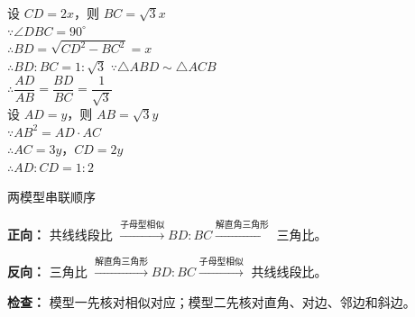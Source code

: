 \documentclass{exam-zh}
\begin{document}
\begin{eduDualExplain}
  \begin{eduExplainLeft}
  \end{eduExplainLeft}

  \begin{eduExplainRight}
设 $CD=2x$，则 $BC=\sqrt3x$\\
$\because \angle DBC=90^\circ$\\
$\therefore BD=\sqrt{CD^2-BC^2}=x$\\
$\therefore BD:BC=1:\sqrt3$
$\because \triangle ABD\sim\triangle ACB$\\
$\therefore \dfrac{AD}{AB}=\dfrac{BD}{BC}=\dfrac1{\sqrt3}$\\
设 $AD=y$，则 $AB=\sqrt3y$\\
$\because AB^2=AD\cdot AC$\\
$\therefore AC=3y$，$CD=2y$\\
$\therefore AD:CD=1:2$
  \end{eduExplainRight}
\end{eduDualExplain}




\begin{eduSummaryBlock}{\eduIconPin}{两模型串联顺序}
\begin{eduBulletList}
  \item \textbf{正向：} 共线线段比 $\xrightarrow{\text{子母型相似}} BD:BC \xrightarrow{\text{解直角三角形}}$ 三角比。  \item \textbf{反向：} 三角比 $\xrightarrow{\text{解直角三角形}} BD:BC \xrightarrow{\text{子母型相似}}$ 共线线段比。  \item \textbf{检查：} 模型一先核对相似对应；模型二先核对直角、对边、邻边和斜边。\end{eduBulletList}
\end{eduSummaryBlock}
\end{document}

